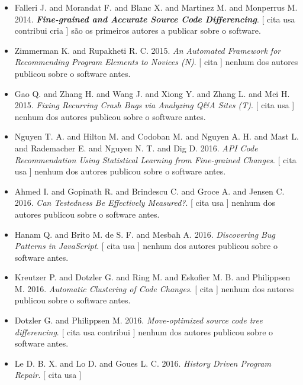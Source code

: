 \begin{itemize}
\item Falleri J. and Morandat F. and Blanc X. and Martinez M. and Monperrus M.
      2014.
        \textbf{\textit{ Fine-grained and Accurate Source Code Differencing}}.
      [
          cita
          usa
          contribui
          cria
      ]
são os primeiros autores a publicar sobre o software.
\item Zimmerman K. and Rupakheti R. C.
      2015.
        \textit{ An Automated Framework for Recommending Program Elements to Novices (N)}.
      [
          cita
      ]
nenhum dos autores publicou sobre o software antes.
\item Gao Q. and Zhang H. and Wang J. and Xiong Y. and Zhang L. and Mei H.
      2015.
        \textit{ Fixing Recurring Crash Bugs via Analyzing Q\&A Sites (T)}.
      [
          cita
          usa
      ]
nenhum dos autores publicou sobre o software antes.
\item Nguyen T. A. and Hilton M. and Codoban M. and Nguyen A. H. and Mast L. and Rademacher E. and Nguyen N. T. and Dig D.
      2016.
        \textit{ API Code Recommendation Using Statistical Learning from Fine-grained Changes}.
      [
          cita
          usa
      ]
nenhum dos autores publicou sobre o software antes.
\item Ahmed I. and Gopinath R. and Brindescu C. and Groce A. and Jensen C.
      2016.
        \textit{ Can Testedness Be Effectively Measured?}.
      [
          cita
          usa
      ]
nenhum dos autores publicou sobre o software antes.
\item Hanam Q. and Brito M. de S. F. and Mesbah A.
      2016.
        \textit{ Discovering Bug Patterns in JavaScript}.
      [
          cita
          usa
      ]
nenhum dos autores publicou sobre o software antes.
\item Kreutzer P. and Dotzler G. and Ring M. and Eskofier M. B. and Philippsen M.
      2016.
        \textit{ Automatic Clustering of Code Changes}.
      [
          cita
      ]
nenhum dos autores publicou sobre o software antes.
\item Dotzler G. and Philippsen M.
      2016.
        \textit{ Move-optimized source code tree differencing}.
      [
          cita
          usa
          contribui
      ]
nenhum dos autores publicou sobre o software antes.
\item Le D. B. X. and Lo D. and Goues L. C.
      2016.
        \textit{ History Driven Program Repair}.
      [
          cita
          usa
      ]

\end{itemize}
